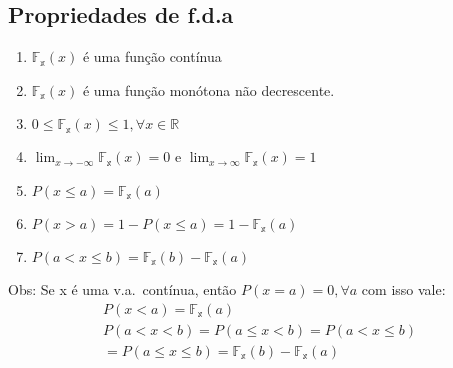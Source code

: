 \documentclass[11pt,a4paper]{article}
\begin{document}
\subsection{Propriedades de f.d.a}
\begin{enumerate}[label=(\alph*)]
  \item $\mathbb{F_{x}}(x)$  é uma função contínua
  \item $\mathbb{F_{x}}(x)$ é uma função monótona não decrescente. 
  \item  $0\le \mathbb{F_{x}}(x)\le 1, \forall x \in \mathbb{R}$
  \item $ \lim_{x \to -\infty} \mathbb{F_{x}}(x)=0$ e $ \lim_{x \to \infty} \mathbb{F_{x}}(x)=1$
  \item $P(x \le a) = \mathbb{F_{x}}(a)$
  \item $P(x>a)=1 - P(x \le a)= 1 - \mathbb{F_{x}}(a)$
  \item $P(a<x\le b)= \mathbb{F_{x}}(b)- \mathbb{F_{x}}(a)$
\end{enumerate}
Obs: Se x é uma v.a.\ contínua, então $P(x=a)=0, \forall a$ com isso vale: 
\begin{align}
  P(x<a)=\mathbb{F_{x}}(a)\\
  P(a<x<b)= P(a \le x < b)= P(a < x \le b)\\
  = P(a \le x \le b)=\mathbb{F_{x}}(b)-\mathbb{F_{x}}(a)
\end{align}
\end{document}
